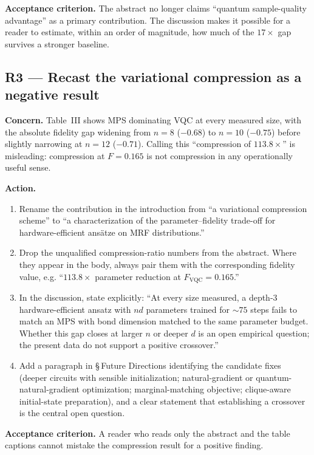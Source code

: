 \documentclass[conference,10pt]{IEEEtran}
\begin{document}
\textbf{Acceptance criterion.} The abstract no longer claims ``quantum
sample-quality advantage'' as a primary contribution. The discussion
makes it possible for a reader to estimate, within an order of
magnitude, how much of the $17\times$ gap survives a stronger baseline.

\subsection{R3 --- Recast the variational compression as a negative result}

\textbf{Concern.} Table~III shows MPS dominating VQC at every measured
size, with the absolute fidelity gap widening from $n=8$ ($-0.68$) to
$n=10$ ($-0.75$) before slightly narrowing at $n=12$ ($-0.71$). Calling
this ``compression of $113.8\times$'' is misleading: compression at
$F=0.165$ is not compression in any operationally useful sense.

\textbf{Action.}
\begin{enumerate}[leftmargin=*]
    \item Rename the contribution in the introduction from ``a variational
    compression scheme'' to ``a characterization of the parameter--fidelity
    trade-off for hardware-efficient ans\"atze on MRF distributions.''
    \item Drop the unqualified compression-ratio numbers from the abstract.
    Where they appear in the body, always pair them with the corresponding
    fidelity value, e.g. ``$113.8\times$ parameter reduction at
    $F_{\mathrm{VQC}} = 0.165$.''
    \item In the discussion, state explicitly: ``At every size measured,
    a depth-3 hardware-efficient ansatz with $nd$ parameters trained for
    $\sim 75$ steps fails to match an MPS with bond dimension matched to
    the same parameter budget. Whether this gap closes at larger $n$ or
    deeper $d$ is an open empirical question; the present data do not
    support a positive crossover.''
    \item Add a paragraph in \S\,Future Directions identifying the
    candidate fixes (deeper circuits with sensible initialization;
    natural-gradient or quantum-natural-gradient optimization;
    marginal-matching objective; clique-aware initial-state preparation),
    and a clear statement that establishing a crossover is the central
    open question.
\end{enumerate}

\textbf{Acceptance criterion.} A reader who reads only the abstract and
the table captions cannot mistake the compression result for a positive
finding.
\end{document}
